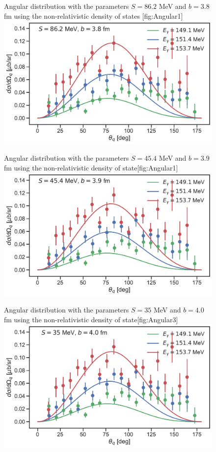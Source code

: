 \begin{figure}[H]
	\begin{sidecaption}{Angular distribution with the parameters $S=86.2$ MeV and $b=3.8$ fm using the non-relativistic density of states }[fig:Angular1]
		\includegraphics[width=\linewidth]{Figures/MultiDiffcross_nonrel_1.pdf}
	\end{sidecaption}
\end{figure}
\begin{figure}[H]
	\begin{sidecaption}{Angular distribution with the parameters $S=45.4$ MeV and $b=3.9$ fm using the non-relativistic density of state}[fig:Angular1]
		\includegraphics[width=\linewidth]{Figures/MultiDiffcross_nonrel_2.pdf}
	\end{sidecaption}
\end{figure}
\begin{figure}[H]
	\begin{sidecaption}{Angular distribution with the parameters $S=35$ MeV and $b=4.0$ fm using the non-relativistic density of state}[fig:Angular3]
		\includegraphics[width=\linewidth]{Figures/MultiDiffcross_nonrel_3.pdf}
	\end{sidecaption}
\end{figure}

